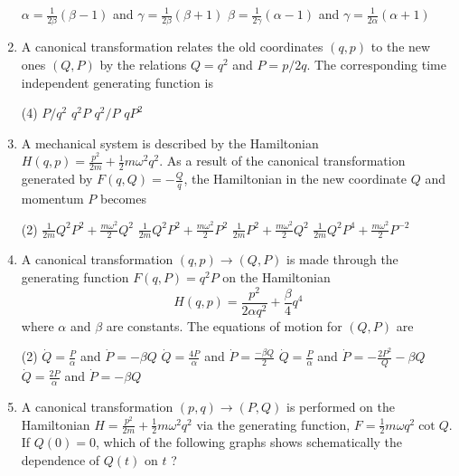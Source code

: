 \begin{enumerate}
\begin{tasks}
		\task[\textbf{c.}]$\alpha=\frac{1}{2 \beta}(\beta-1)$ and $\gamma=\frac{1}{2 \beta}(\beta+1)$
		\task[\textbf{d.}] $\beta=\frac{1}{2 \gamma}(\alpha-1)$ and $\gamma=\frac{1}{2 \alpha}(\alpha+1)$
	\end{tasks}
	\item  A canonical transformation relates the old coordinates $(q, p)$ to the new ones $(Q, P)$ by the relations $Q=q^{2}$ and $P=p / 2 q$. The corresponding time independent generating function is
	{}
	 \begin{tasks}(4)
		\task[\textbf{a.}]$P / q^{2}$
		\task[\textbf{b.}]$q^{2} P$
		\task[\textbf{c.}]$q^{2} / P$
		\task[\textbf{d.}] $q P^{2}$ 
	\end{tasks}
	\item  A mechanical system is described by the Hamiltonian $H(q, p)=\frac{p^{2}}{2 m}+\frac{1}{2} m \omega^{2} q^{2}$. As a result of the canonical transformation generated by $F(q, Q)=-\frac{Q}{q}$, the Hamiltonian in the new coordinate $Q$ and momentum $P$ becomes
{}
	 \begin{tasks}(2)
		\task[\textbf{a.}] $\frac{1}{2 m} Q^{2} P^{2}+\frac{m \omega^{2}}{2} Q^{2}$
		\task[\textbf{b.}]$\frac{1}{2 m} Q^{2} P^{2}+\frac{m \omega^{2}}{2} P^{2}$
		\task[\textbf{c.}]$\frac{1}{2 m} P^{2}+\frac{m \omega^{2}}{2} Q^{2}$
		\task[\textbf{d.}] $\frac{1}{2 m} Q^{2} P^{4}+\frac{m \omega^{2}}{2} P^{-2}$
	\end{tasks}
	\item  A canonical transformation $(q, p) \rightarrow(Q, P)$ is made through the generating function $F(q, P)=q^{2} P$ on the Hamiltonian
	$$
	H(q, p)=\frac{p^{2}}{2 \alpha q^{2}}+\frac{\beta}{4} q^{4}
	$$
	where $\alpha$ and $\beta$ are constants. The equations of motion for $(Q, P)$ are
{}
	 \begin{tasks}(2)
		\task[\textbf{a.}] $\dot{Q}=\frac{P}{\alpha}$ and $\dot{P}=-\beta Q$
		\task[\textbf{b.}] $\dot{Q}=\frac{4 P}{\alpha}$ and $\dot{P}=\frac{-\beta Q}{2}$
		\task[\textbf{c.}]$\dot{Q}=\frac{P}{\alpha}$ and $\dot{P}=-\frac{2 P^{2}}{Q}-\beta Q$
		\task[\textbf{d.}] $\dot{Q}=\frac{2 P}{\alpha}$ and $\dot{P}=-\beta Q$
	\end{tasks}
	\item  A canonical transformation $(p, q) \rightarrow(P, Q)$ is performed on the Hamiltonian $H=\frac{p^{2}}{2 m}+\frac{1}{2} m \omega^{2} q^{2}$ via the generating function, $F=\frac{1}{2} m \omega q^{2} \cot Q$. If $Q(0)=0$, which of the following graphs shows schematically the dependence of $Q(t)$ on $t$ ?

\end{enumerate}
